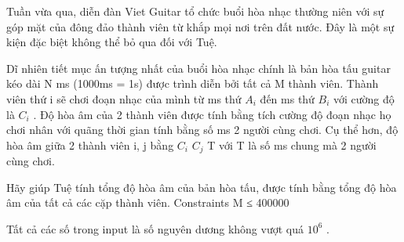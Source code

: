 Tuần vừa qua, diễn đàn Viet Guitar tổ chức buổi hòa nhạc thường niên với sự góp mặt của đông đảo thành viên từ khắp mọi nơi trên đất nước. Đây là một sự kiện đặc biệt không thể bỏ qua đối với Tuệ.  

   Dĩ nhiên tiết mục ấn tượng nhất của buổi hòa nhạc chính là bản hòa tấu guitar kéo dài N ms (1000ms = 1s) được trình diễn bởi tất cả M thành viên. Thành viên thứ i sẽ chơi đoạn nhạc của mình từ ms thứ $A_{i}$   đến ms thứ $B_{i}$   với cường độ là $C_{i}$   . Độ hòa âm của 2 thành viên được tính bằng tích cường độ đoạn nhạc họ chơi nhân với quãng thời gian tính bằng số ms 2 người cùng chơi. Cụ thể hơn, độ hòa âm giữa 2 thành viên i, j bằng $C_{i}$   $C_{j}$   T với T là số ms chung mà 2 người cùng chơi.  

   Hãy giúp Tuệ tính tổng độ hòa âm của bản hòa tấu, được tính bằng tổng độ hòa âm của tất cả các cặp thành viên.
   Constraints  
M ≤ 400000  

   Tất cả các số trong input là số nguyên dương không vượt quá $10^{6}$   .